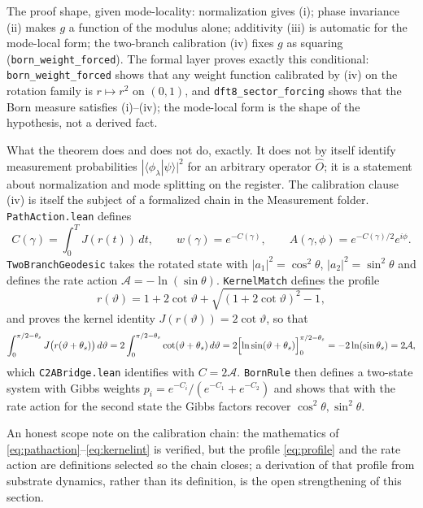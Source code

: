 \documentclass[11pt,letterpaper]{article}
\newcommand{\lean}[1]{\texttt{#1}}
\begin{document}
The proof shape, given mode-locality: normalization gives (i); phase invariance (ii) makes $g$ a function of the modulus alone; additivity (iii) is automatic for the mode-local form; the two-branch calibration (iv) fixes $g$ as squaring (\lean{born\_weight\_forced}). The formal layer proves exactly this conditional: \lean{born\_weight\_forced} shows that any weight function calibrated by (iv) on the rotation family is $r\mapsto r^{2}$ on $(0,1)$, and \lean{dft8\_sector\_forcing} shows that the Born measure satisfies (i)--(iv); the mode-local form is the shape of the hypothesis, not a derived fact.

What the theorem does and does not do, exactly. It does not by itself identify measurement probabilities $|\langle\phi_{\lambda}|\psi\rangle|^{2}$ for an arbitrary operator $\hat{O}$; it is a statement about normalization and mode splitting on the register. The calibration clause (iv) is itself the subject of a formalized chain in the Measurement folder. \lean{PathAction.lean} defines
\begin{equation}
C(\gamma)=\int_{0}^{T}J(r(t))\,dt,\qquad w(\gamma)=e^{-C(\gamma)},\qquad A(\gamma,\phi)=e^{-C(\gamma)/2}e^{i\phi}.
\label{eq:pathaction}
\end{equation}
\lean{TwoBranchGeodesic} takes the rotated state with $|a_{1}|^{2}=\cos^{2}\theta$, $|a_{2}|^{2}=\sin^{2}\theta$ and defines the rate action $\mathcal{A}=-\ln(\sin\theta)$. \lean{KernelMatch} defines the profile
\begin{equation}
r(\vartheta)=1+2\cot\vartheta+\sqrt{\left(1+2\cot\vartheta\right)^{2}-1},
\label{eq:profile}
\end{equation}
and proves the kernel identity $J(r(\vartheta))=2\cot\vartheta$, so that
\begin{equation}
\int_{0}^{\pi/2-\theta_{s}}J\bigl(r(\vartheta+\theta_{s})\bigr)\,d\vartheta
=2\int_{0}^{\pi/2-\theta_{s}}\cot(\vartheta+\theta_{s})\,d\vartheta
=2\Bigl[\ln\sin(\vartheta+\theta_{s})\Bigr]_{0}^{\pi/2-\theta_{s}}
=-2\ln(\sin\theta_{s})=2\mathcal{A},
\label{eq:kernelint}
\end{equation}
which \lean{C2ABridge.lean} identifies with $C=2\mathcal{A}$. \lean{BornRule} then defines a two-state system with Gibbs weights $p_{i}=e^{-C_{i}}/(e^{-C_{1}}+e^{-C_{2}})$ and shows that with the rate action for the second state the Gibbs factors recover $\cos^{2}\theta,\sin^{2}\theta$.

An honest scope note on the calibration chain: the mathematics of \eqref{eq:pathaction}--\eqref{eq:kernelint} is verified, but the profile \eqref{eq:profile} and the rate action are definitions selected so the chain closes; a derivation of that profile from substrate dynamics, rather than its definition, is the open strengthening of this section.
\end{document}
